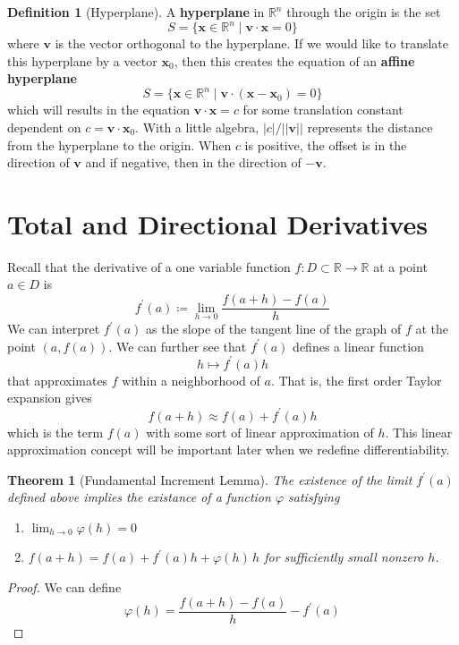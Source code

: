 \documentclass{article}
\newtheorem{theorem}{Theorem}[section]
\theoremstyle{remark}
\theoremstyle{definition}
\newtheorem{definition}{Definition}[section]
\begin{document}
\begin{definition}[Hyperplane]
A \textbf{hyperplane} in $\mathbb{R}^n$ through the origin is the set
\[S = \{\mathbf{x} \in \mathbb{R}^n \mid \mathbf{v} \cdot \mathbf{x} = 0\}\]
where $\mathbf{v}$ is the vector orthogonal to the hyperplane. If we would like to translate this hyperplane by a vector $\mathbf{x}_0$, then this creates the equation of an \textbf{affine hyperplane} 
\[S = \{\mathbf{x} \in \mathbb{R}^n \mid \mathbf{v} \cdot (\mathbf{x} - \mathbf{x}_0) = 0\}\]
which will results in the equation $\mathbf{v} \cdot \mathbf{x} = c$ for some translation constant dependent on $c = \mathbf{v} \cdot \mathbf{x}_0$. With a little algebra, $|c|/||\mathbf{v}||$ represents the distance from the hyperplane to the origin. When $c$ is positive, the offset is in the direction of $\mathbf{v}$ and if negative, then in the direction of $-\mathbf{v}$. 
\end{definition}

\section{Total and Directional Derivatives}
Recall that the derivative of a one variable function $f: D \subset \mathbb{R} \longrightarrow \mathbb{R}$ at a point $a \in D$ is 
\[f^\prime (a) \coloneqq \lim_{h \rightarrow 0} \frac{f(a + h) - f(a)}{h}\]
We can interpret $f^\prime (a)$ as the slope of the tangent line of the graph of $f$ at the point $(a, f(a))$. We can further see that $f^\prime (a)$ defines a linear function 
\[h \mapsto f^\prime (a) h\]
that approximates $f$ within a neighborhood of $a$. That is, the first order Taylor expansion gives 
\[f(a + h) \approx f(a) + f^\prime(a) h\]
which is the term $f(a)$ with some sort of linear approximation of $h$. This linear approximation concept will be important later when we redefine differentiability. 

\begin{theorem}[Fundamental Increment Lemma]
The existence of the limit $f^\prime(a)$ defined above implies the existance of a function $\varphi$ satisfying 
\begin{enumerate}
    \item $\lim_{h \rightarrow 0} \varphi(h) = 0$ 
    \item $f(a + h) = f(a) + f^\prime (a) h + \varphi(h) \, h$ for sufficiently small nonzero $h$. 
\end{enumerate}
\end{theorem}
\begin{proof}
We can define 
\[\varphi(h) = \frac{f(a + h) - f(a)}{h} - f^\prime(a)\]
\end{proof}
\end{document}
